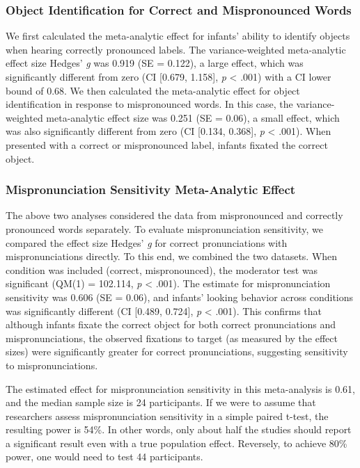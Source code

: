 \documentclass[
  english,
  man, noextraspace]{apa6}
\begin{document}
\hypertarget{object-identification-for-correct-and-mispronounced-words}{%
\subsubsection{Object Identification for Correct and Mispronounced Words}\label{object-identification-for-correct-and-mispronounced-words}}

We first calculated the meta-analytic effect for infants' ability to identify objects when hearing correctly pronounced labels. The variance-weighted meta-analytic effect size Hedges' \emph{g} was 0.919 (SE = 0.122), a large effect, which was significantly different from zero (CI {[}0.679, 1.158{]}, \emph{p} \textless{} .001) with a CI lower bound of 0.68. We then calculated the meta-analytic effect for object identification in response to mispronounced words. In this case, the variance-weighted meta-analytic effect size was 0.251 (SE = 0.06), a small effect, which was also significantly different from zero (CI {[}0.134, 0.368{]}, \emph{p} \textless{} .001). When presented with a correct or mispronounced label, infants fixated the correct object.

\hypertarget{mispronunciation-sensitivity-meta-analytic-effect}{%
\subsubsection{Mispronunciation Sensitivity Meta-Analytic Effect}\label{mispronunciation-sensitivity-meta-analytic-effect}}

The above two analyses considered the data from mispronounced and correctly pronounced words separately. To evaluate mispronunciation sensitivity, we compared the effect size Hedges' \emph{g} for correct pronunciations with mispronunciations directly. To this end, we combined the two datasets. When condition was included (correct, mispronounced), the moderator test was significant (QM(1) = 102.114, \emph{p} \textless{} .001). The estimate for mispronunciation sensitivity was 0.606 (SE = 0.06), and infants' looking behavior across conditions was significantly different (CI {[}0.489, 0.724{]}, \emph{p} \textless{} .001). This confirms that although infants fixate the correct object for both correct pronunciations and mispronunciations, the observed fixations to target (as measured by the effect sizes) were significantly greater for correct pronunciations, suggesting sensitivity to mispronunciations.

The estimated effect for mispronunciation sensitivity in this meta-analysis is 0.61, and the median sample size is 24 participants. If we were to assume that researchers assess mispronunciation sensitivity in a simple paired t-test, the resulting power is 54\%. In other words, only about half the studies should report a significant result even with a true population effect. Reversely, to achieve 80\% power, one would need to test 44 participants.
\end{document}
